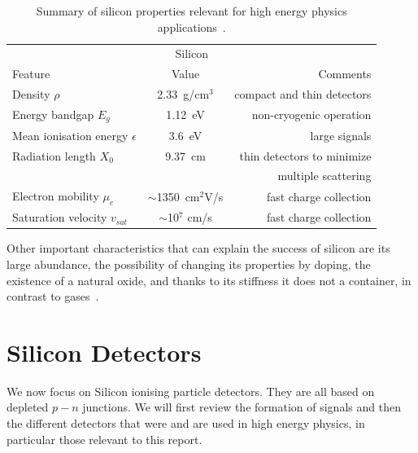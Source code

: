 \begin{table}[!htbp]
   \caption{\label{tab:SiProp}Summary of silicon properties relevant for high energy physics applications~\cite{Lutz:411172}.}
   \label{tab:SiProperties}
   \centering
   \begin{tabular}{@{} lcr @{}} %
      \toprule
      \multicolumn{3}{c}{Silicon} \\
      \cmidrule(r){1-3} %
      Feature    & Value & Comments \\
      \midrule
      \midrule
      Density  $\rho$    & 2.33~g/cm${^3}$ & compact and thin detectors  \\
      Energy bandgap $E_g$ & 1.12~eV & non-cryogenic operation \\
      Mean ionisation energy $\epsilon$ & 3.6~eV & large signals\\
      Radiation length $X_0$      &  9.37~cm & thin detectors to minimize  \\
                                       &                 & multiple scattering \\
      Electron mobility  $\mu_e$     & $\sim$1350~cm$^2$V/s  & fast charge collection \\
      Saturation velocity $v_{sat}$ & $\sim$10$^{7}$ cm/s & fast charge collection \\
      \bottomrule
   \end{tabular}
\end{table}

Other important characteristics that can explain the success of silicon are its large abundance, 
the possibility of changing its properties by doping, the existence of a natural oxide, 
and thanks to its stiffness it does not a container, in contrast to 
gases~\cite{Hartmann2012}.

\section{Silicon Detectors}
\label{sec:Trackers}
We now focus on Silicon ionising particle detectors. They are all based on depleted $p-n$ junctions.  
We will first review the formation of signals and then the different detectors that were and are used 
in high energy physics, in particular those relevant to this report.

